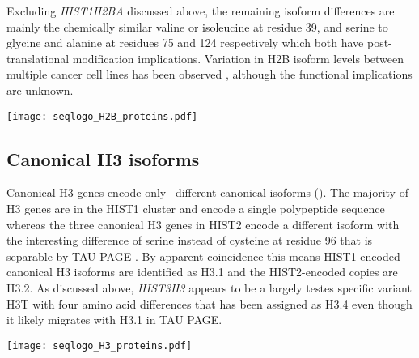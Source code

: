     Excluding \textit{HIST1H2BA} discussed above,
    the remaining isoform differences are mainly the chemically
    similar valine or isoleucine at residue 39,
    and serine to glycine and alanine at residues 75 and 124 respectively
    which both have post-translational modification implications.
    Variation in H2B isoform levels between multiple cancer cell
    lines has been observed \citep{Molden2015},
    although the functional implications are unknown.

    \begin{table}
      \caption{%
        Canonical H2B protein isoforms.  Upper panel shows isoforms
        relative to the most common protein sequence.  Lower panel
        shows sequence logo of all isoforms aligned with invariant
        residues in grey.
      }
      \label{tab:H2B-consensus}
      
      \texttt{[image: seqlogo\_H2B\_proteins.pdf]}
    \end{table}

  \subsection{Canonical H3 isoforms}
    Canonical H3 genes encode only \HThreeUniqueProteins{}~different
    canonical isoforms ().
    The majority of H3 genes are in the HIST1 cluster and encode a
    single polypeptide sequence \citep{Ederveen2011}
    whereas the three canonical H3 genes in HIST2 encode a different isoform
    with the interesting difference of serine instead of cysteine at residue 96
    that is separable by TAU PAGE \citep{FranklinZweidler1977}.
    By apparent coincidence this means HIST1-encoded canonical H3 isoforms are
    identified as H3.1 and the HIST2-encoded copies are H3.2.
    As discussed above, \textit{HIST3H3} appears to be
    a largely testes specific variant H3T
    with four amino acid differences that has been assigned as H3.4 \citep{Talbert2012}
    even though it likely migrates with H3.1 in TAU PAGE.

    \begin{table}
      \caption{%
        Canonical H3 protein isoforms.  Upper panel shows isoforms
        relative to the most common protein sequence.  Lower panel
        shows sequence logo of all isoforms aligned with invariant
        residues in grey.
      }
      \label{tab:H3-consensus}
      
      \texttt{[image: seqlogo\_H3\_proteins.pdf]}
    \end{table}

